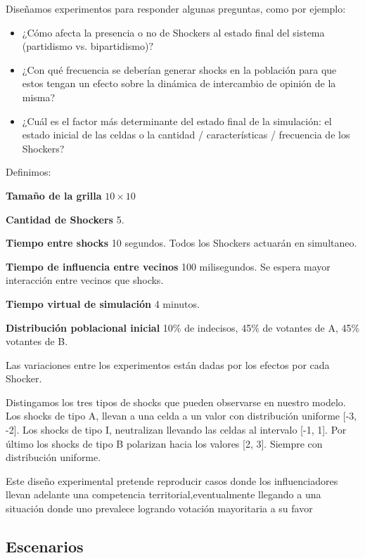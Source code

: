 Diseñamos experimentos para responder algunas preguntas, como por ejemplo:
\begin{itemize}
\item ¿Cómo afecta la presencia o no de Shockers al estado final del sistema (partidismo vs. bipartidismo)$?$ 
\item ¿Con qué frecuencia se deberían generar shocks en la población para que estos tengan un efecto sobre la dinámica de intercambio de opinión de la misma?
\item ¿Cuál es el factor más determinante del estado final de la simulación: el estado inicial de las celdas o la cantidad / características / frecuencia de los Shockers?
\end{itemize}

Definimos:

\begin{description}
    \item \textbf{Tamaño de la grilla}  $10 \times 10$
    \item \textbf{Cantidad de Shockers} 5.
    \item \textbf{Tiempo entre shocks} 10 segundos. Todos los Shockers actuarán en simultaneo.
    \item \textbf{Tiempo de influencia entre vecinos} 100 milisegundos. Se espera mayor interacción entre vecinos que shocks.
    \item \textbf{Tiempo virtual de simulación} 4 minutos.
    \item \textbf{Distribución poblacional inicial} 10\% de indecisos, 45\% de votantes de A, 45\% votantes de B.
\end{description}

Las variaciones entre los experimentos están dadas por los efectos por cada Shocker.

Distingamos los tres tipos de shocks que pueden observarse en nuestro modelo.
Los shocks de tipo A, llevan a una celda a un valor con distribución
uniforme [-3, -2]. Los shocks de tipo I, neutralizan
llevando las celdas al intervalo  [-1, 1]. Por último los shocks de tipo B
polarizan hacia los valores [2, 3]. Siempre con distribución uniforme.

Este diseño experimental pretende reproducir casos donde los influenciadores
llevan adelante una competencia territorial,eventualmente llegando a una
situación donde uno prevalece logrando votación mayoritaria a su favor

\subsection{Escenarios} %
\label{sub:Escenarios}

